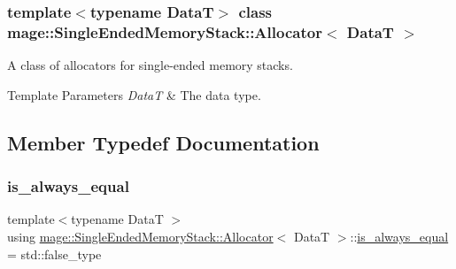 \subsubsection*{template$<$typename DataT$>$\newline
class mage\+::\+Single\+Ended\+Memory\+Stack\+::\+Allocator$<$ Data\+T $>$}

A class of allocators for single-\/ended memory stacks.


\begin{DoxyTemplParams}{Template Parameters}
{\em DataT} & The data type. \\
\hline
\end{DoxyTemplParams}


\subsection{Member Typedef Documentation}
\hypertarget{classmage_1_1_single_ended_memory_stack_1_1_allocator_a64d005be12e9d1749c0e6eeea5107a98}{}\label{classmage_1_1_single_ended_memory_stack_1_1_allocator_a64d005be12e9d1749c0e6eeea5107a98} 
\subsubsection{\texorpdfstring{is\+\_\+always\+\_\+equal}{is\_always\_equal}}
{\footnotesize\ttfamily template$<$typename DataT $>$ \\
using \hyperlink{classmage_1_1_single_ended_memory_stack_1_1_allocator}{mage\+::\+Single\+Ended\+Memory\+Stack\+::\+Allocator}$<$ DataT $>$\+::\hyperlink{classmage_1_1_single_ended_memory_stack_1_1_allocator_a64d005be12e9d1749c0e6eeea5107a98}{is\+\_\+always\+\_\+equal} =  std\+::false\+\_\+type}

\hypertarget{classmage_1_1_single_ended_memory_stack_1_1_allocator_a408c0a4b29dc60e9564245c6a0a6fd4c}{}\label{classmage_1_1_single_ended_memory_stack_1_1_allocator_a408c0a4b29dc60e9564245c6a0a6fd4c} 
